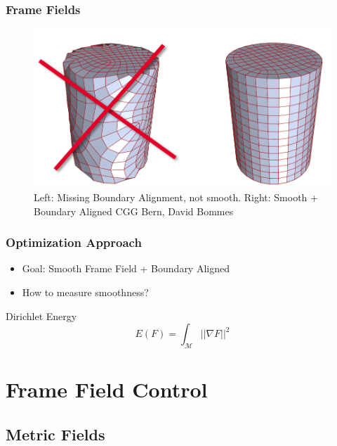 \documentclass[
	11pt, %
	aspectratio=169, %
]{beamer}
\begin{document}
\begin{frame}
	\frametitle{Frame Fields}
	\begin{figure}
		\includegraphics[width=0.7\linewidth]{requirements.png}
		\caption{Left: Missing Boundary Alignment, not smooth. Right: Smooth + Boundary Aligned \textcopyright CGG Bern, David Bommes}
	\end{figure}
\end{frame}

\begin{frame}
	\frametitle{Optimization Approach}
	\begin{itemize}
		\item Goal: Smooth Frame Field + Boundary Aligned
		\item How to measure smoothness? 
	\end{itemize}

	Dirichlet Energy
	\begin{equation}
		E(F) = \int_\mathcal{M} ||\nabla F||^2
	\end{equation}
\end{frame}


\section{Frame Field Control}

\subsection{Metric Fields}
\end{document}
